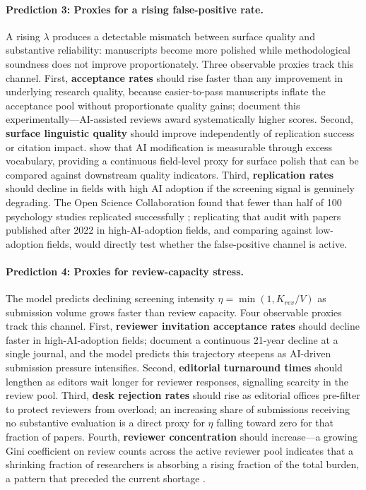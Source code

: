 \documentclass{article}
\begin{document}
\paragraph{Prediction 3: Proxies for a rising false-positive rate.}
A rising $\lambda$ produces a detectable mismatch between surface quality and substantive reliability: manuscripts become more polished while methodological soundness does not improve proportionately.
Three observable proxies track this channel.
First, \textbf{acceptance rates} should rise faster than any improvement in underlying research quality, because easier-to-pass manuscripts inflate the acceptance pool without proportionate quality gains; \citet{Latona2024} document this experimentally---AI-assisted reviews award systematically higher scores.
Second, \textbf{surface linguistic quality} should improve independently of replication success or citation impact.
\citet{Kobak2025} show that AI modification is measurable through excess vocabulary, providing a continuous field-level proxy for surface polish that can be compared against downstream quality indicators.
Third, \textbf{replication rates} should decline in fields with high AI adoption if the screening signal is genuinely degrading.
The Open Science Collaboration found that fewer than half of 100 psychology studies replicated successfully \citep{OSC2015}; replicating that audit with papers published after 2022 in high-AI-adoption fields, and comparing against low-adoption fields, would directly test whether the false-positive channel is active.

\paragraph{Prediction 4: Proxies for review-capacity stress.}
The model predicts declining screening intensity $\eta = \min(1, K_{rev}/V)$ as submission volume grows faster than review capacity.
Four observable proxies track this channel.
First, \textbf{reviewer invitation acceptance rates} should decline faster in high-AI-adoption fields; \citet{Meyerson2025} document a continuous 21-year decline at a single journal, and the model predicts this trajectory steepens as AI-driven submission pressure intensifies.
Second, \textbf{editorial turnaround times} should lengthen as editors wait longer for reviewer responses, signalling scarcity in the review pool.
Third, \textbf{desk rejection rates} should rise as editorial offices pre-filter to protect reviewers from overload; an increasing share of submissions receiving no substantive evaluation is a direct proxy for $\eta$ falling toward zero for that fraction of papers.
Fourth, \textbf{reviewer concentration} should increase---a growing Gini coefficient on review counts across the active reviewer pool indicates that a shrinking fraction of researchers is absorbing a rising fraction of the total burden, a pattern that preceded the current shortage \citep{Kovanis2016}.
\end{document}
